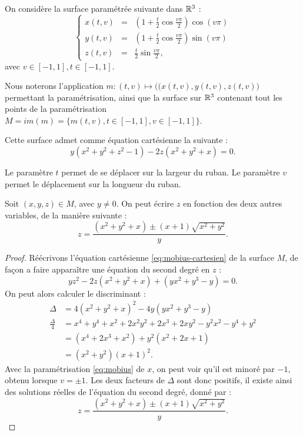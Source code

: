 \documentclass[hidelinks, 10pt]{article}
\begin{document}
\begin{definition}\label{def:mobius-R3}
On considère la surface paramétrée suivante dans $\mathbb{R}^3$ : \begin{equation}\label{eq:mobius}
\left\{\begin{matrix}
x(t,v)&=&\left(1+\frac{t}{2}\cos\frac{v\pi}{2} \right )\cos (v\pi)\\ 
y(t,v)&=&\left(1+\frac{t}{2}\cos\frac{v\pi}{2} \right )\sin (v\pi)\\ 
z(t,v)&=&\frac{t}{2}\sin\frac{v\pi}{2},
\end{matrix}\right.
\end{equation}
avec $v\in[-1,1],t\in[-1,1]$.

Nous noterons l'application $m:(t,v)\mapsto\big((x(t,v),y(t,v),z(t,v)\big)$ permettant la paramétrisation, ainsi que la surface sur $\mathbb{R}^3$ contenant tout les points de la paramétrisation $M=im(m)=\{m(t,v),t\in[-1,1],v\in[-1,1]\}$.

Cette surface admet comme équation cartésienne la suivante : \begin{equation}\label{eq:mobius-cartesien}
y(x^2+y^2+z^2-1)-2z(x^2+y^2+x)=0.
\end{equation}
\end{definition}

\begin{remark}
Le paramètre $t$ permet de se déplacer sur la largeur du ruban. Le paramètre $v$ permet le déplacement sur la longueur du ruban.
\end{remark}

\begin{proposition}\label{prop:mobius-z-value}
Soit $(x,y,z)\in M$, avec $y\neq0$. On peut écrire $z$ en fonction des deux autres variables, de la manière suivante : $$z=\frac{(x^2+y^2+x)\pm(x+1)\sqrt{x^2+y^2}}{y}.$$
\end{proposition}
\begin{proof}
Réécrivons l'équation cartésienne \eqref{eq:mobius-cartesien} de la surface $M$, de façon a faire apparaître une équation du second degré en $z$ : \[yz^2-2z(x^2+y^2+x)+(yx^2+y^3-y)=0.\]On peut alors calculer le discriminant : \[
\begin{split}
\Delta&=4(x^2+y^2+x)^2-4y(yx^2+y^3-y)\\
\frac{\Delta}{4}&=x^4+y^4+x^2+2x^2y^2+2x^3+2xy^2-y^2x^2-y^4+y^2\\
&=(x^4+2x^3+x^2)+y^2(x^2+2x+1)\\
&=(x^2+y^2)(x+1)^2.
\end{split}\] Avec la paramétrisation \eqref{eq:mobius} de $x$, on peut voir qu'il est minoré par $-1$, obtenu lorsque $v=\pm1$. Les deux facteurs de $\Delta$ sont donc positifs, il existe ainsi des solutions réelles de l'équation du second degré, donné par : \[z=\frac{(x^2+y^2+x)\pm(x+1)\sqrt{x^2+y^2}}{y}.\]
\end{proof}
\end{document}
